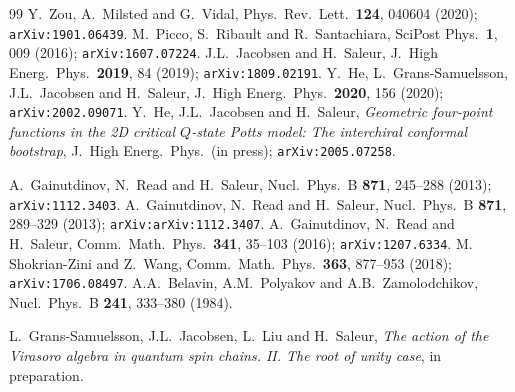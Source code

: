 \documentclass[a4paper,10pt]{article}
\begin{document}
\begin{thebibliography}{99}
 Y.\ Zou, A.\ Milsted and G.\ Vidal, Phys.\ Rev.\ Lett.\ {\bf 124}, 040604 (2020); {\tt arXiv:1901.06439}.
 M.\ Picco, S.\ Ribault and R.\ Santachiara, SciPost Phys.\ {\bf 1}, 009 (2016); {\tt arXiv:1607.07224}.
 J.L.\ Jacobsen and H.\ Saleur, J.\ High Energ.\ Phys.\ {\bf 2019}, 84 (2019); {\tt arXiv:1809.02191}. 
 Y.\ He, L.\ Grans-Samuelsson, J.L.\ Jacobsen and H.\ Saleur, %
J.\ High Energ.\ Phys.\ {\bf 2020}, 156 (2020);  {\tt arXiv:2002.09071}.
 Y.\ He, J.L.\ Jacobsen and H.\ Saleur, {\sl Geometric four-point functions in the 2D critical $Q$-state Potts model: The interchiral conformal bootstrap}, J.\ High Energ.\ Phys.\ (in press); {\tt arXiv:2005.07258}.


 A.\ Gainutdinov, N.\ Read and H.\ Saleur, %
Nucl.\ Phys.\ B {\bf 871}, 245--288 (2013); {\tt arXiv:1112.3403}.
 A.\ Gainutdinov, N.\ Read and H.\ Saleur,  %
Nucl.\ Phys.\ B {\bf 871}, 289--329 (2013); {\tt arXiv:arXiv:1112.3407}.
 A.\ Gainutdinov, N.\ Read and H.\ Saleur, %
Comm.\ Math.\ Phys.\ {\bf 341}, 35--103 (2016); {\tt arXiv:1207.6334}.
 M. Shokrian-Zini and Z.\ Wang, %
Comm.\ Math.\ Phys.\ {\bf 363}, 877--953 (2018); {\tt arXiv:1706.08497}.
 A.A.\ Belavin, A.M.\ Polyakov and A.B.\ Zamolodchikov, Nucl.\ Phys.\ B {\bf 241}, 333--380 (1984).

 L.\ Grans-Samuelsson, J.L.\ Jacobsen, L.\ Liu and H.\ Saleur, {\sl The action of the Virasoro algebra in quantum spin chains. II. The root of unity case}, in preparation.




\end{thebibliography}
\end{document}
